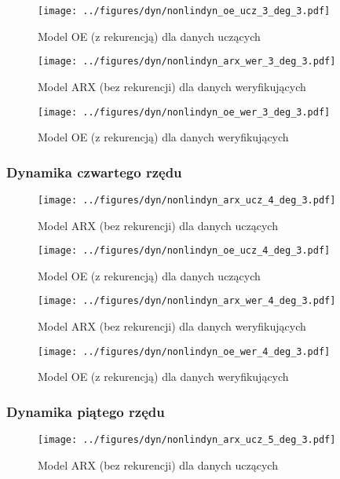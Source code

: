 \documentclass[a4paper,titlepage,11pt,floatssmall]{mwrep}
\begin{document}
\begin{figure}[H]
\centering
\texttt{[image: ../figures/dyn/nonlindyn\_oe\_ucz\_3\_deg\_3.pdf]}
\caption{Model OE (z rekurencją) dla danych uczących}
\end{figure}

\begin{figure}[H]
\centering
\texttt{[image: ../figures/dyn/nonlindyn\_arx\_wer\_3\_deg\_3.pdf]}
\caption{Model ARX (bez rekurencji) dla danych weryfikujących}
\end{figure}

\begin{figure}[H]
\centering
\texttt{[image: ../figures/dyn/nonlindyn\_oe\_wer\_3\_deg\_3.pdf]}
\caption{Model OE (z rekurencją) dla danych weryfikujących}
\end{figure}

\subsubsection{Dynamika czwartego rzędu}
\begin{figure}[H]
\centering
\texttt{[image: ../figures/dyn/nonlindyn\_arx\_ucz\_4\_deg\_3.pdf]}
\caption{Model ARX (bez rekurencji) dla danych uczących}
\end{figure}

\begin{figure}[H]
\centering
\texttt{[image: ../figures/dyn/nonlindyn\_oe\_ucz\_4\_deg\_3.pdf]}
\caption{Model OE (z rekurencją) dla danych uczących}
\end{figure}

\begin{figure}[H]
\centering
\texttt{[image: ../figures/dyn/nonlindyn\_arx\_wer\_4\_deg\_3.pdf]}
\caption{Model ARX (bez rekurencji) dla danych weryfikujących}
\end{figure}

\begin{figure}[H]
\centering
\texttt{[image: ../figures/dyn/nonlindyn\_oe\_wer\_4\_deg\_3.pdf]}
\caption{Model OE (z rekurencją) dla danych weryfikujących}
\end{figure}

\subsubsection{Dynamika piątego rzędu}
\begin{figure}[H]
\centering
\texttt{[image: ../figures/dyn/nonlindyn\_arx\_ucz\_5\_deg\_3.pdf]}
\caption{Model ARX (bez rekurencji) dla danych uczących}
\end{figure}
\end{document}
